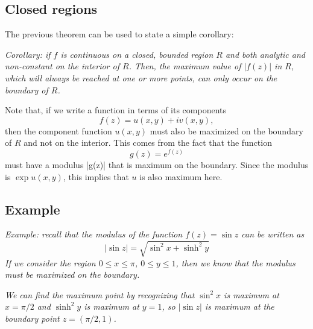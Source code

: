 \documentclass{article}
\begin{document}
\subsection{Closed regions}
The previous theorem can be used to state a simple corollary:

\textit{Corollary: if $f$ is continuous on a closed, bounded region $R$ and both analytic and non-constant on the interior of $R$. Then, the maximum value of $|f(z)|$ in $R$, which will always be reached at one or more points, can only occur on the boundary of $R$.}

Note that, if we write a function in terms of its components 
\[
	f(z) = u(x, y) + iv(x, y),
\]
then the component function $u(x, y)$ must also be maximized on the boundary of $R$ and not on the interior. This comes from the fact that the function
\[
	g(z) = e^{f(z)}
\]
must have a modulus |g(z)| that is maximum on the boundary. Since the modulus is $\exp{u(x, y)}$, this implies that $u$ is also maximum here.

\subsection{Example}
\textit{Example: recall that the modulus of the function $f(z) = \sin z$ can be written as
\[
	|\sin z| = \sqrt{\sin^2 x + \sinh^2 y}
\]
If we consider the region $0 \le x \le \pi$, $0 \le y \le 1$, then we know that the modulus must be maximized on the boundary.}

\textit{We can find the maximum point by recognizing that $\sin^2 x$ is maximum at $x = \pi/2$ and $\sinh^2 y$ is maximum at $y = 1$, so $|\sin z|$ is maximum at the boundary point $z = (\pi / 2, 1)$.}
\end{document}
